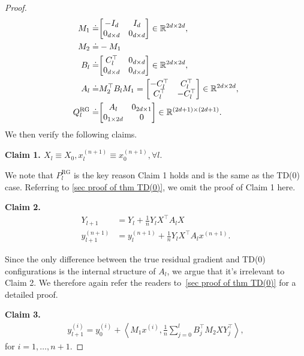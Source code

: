 \documentclass{article}
\newcommand{\R}{\mathbb{R}}
\newcommand{\indot}[2]{{\left<#1, #2\right>}}
\newcommand{\rg}{\text{RG}}
\begin{document}
\begin{proof}
    \begin{align}
      M_1 \doteq& \mqty[-I_{d} & I_{d} \\
                        0_{d \times d} & 0_{d \times d}] \in \R^{2d \times 2d},\\
      M_2 \doteq& -M_1\\
      B_l \doteq& \mqty[C_l^\top & 0_{d\times d} \\ 
                        0_{d \times d} & 0_{d \times d}] \in \R^{2d \times 2d},\\
      A_l \doteq& M_2^\top B_l M_1  = \mqty[-C_l^\top & C_l^\top \\ 
                                            C_l^\top & -C_l^\top] \in \R^{2d \times 2d},\\
      Q_l^{\rg} \doteq& \mqty[A_l & 0_{2d \times 1} \\ 0_{1 \times 2d} & 0] \in \R^{(2d + 1) \times (2d+1)}.
    \end{align}
    We then verify the following claims.
    
    \textbf{Claim 1. $X_l \equiv X_0 , x_l^{(n+1)} \equiv x_0^{(n+1)}, \forall l.$}

    We note that $P_l^{\rg}$ is the key reason Claim 1 holds and is the same as the TD(0) case.
    Referring to \ref{sec proof of thm TD(0)}, we omit the proof of Claim 1 here.

    \textbf{Claim 2.}
    \begin{align}
        Y_{l+1} &= Y_l + \frac{1}{n} Y_l X^\top A_l X\\
        y_{l+1}^{(n+1)} &= y_l^{(n+1)} + \frac{1}{n} Y_l X^\top A_l x^{(n+1)}.
    \end{align}

    Since the only difference between the true residual gradient and TD(0) configurations is the internal structure of $A_l$, we argue that it's irrelevant to Claim 2.
    We therefore again refer the readers to~\ref{sec proof of thm TD(0)} for a detailed proof.

    \textbf{Claim 3.}
    \begin{align}
      y_{l+1}^{(i)} = y_0^{(i)} + \indot{M_1 x^{(i)}}{\frac{1}{n}\sum_{j=0}^l B_j^\top M_2 X Y_j^\top},
    \end{align}
    for $i = 1, \dots, n+1$.
    

\end{proof}
\end{document}
